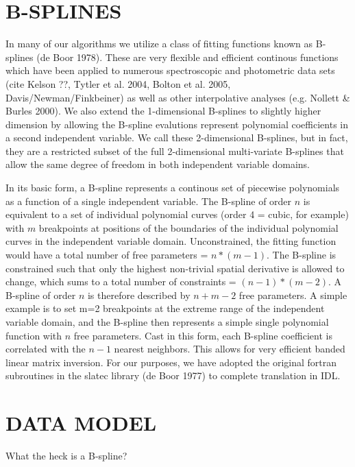 \documentclass[12pt,preprint]{aastex}
\begin{document}
\section{B-SPLINES}
\label{bsplines}

In many of our algorithms we utilize a class of fitting functions known
as B-splines (de Boor 1978).  These are very flexible and efficient 
continous functions which have been applied to numerous spectroscopic
and photometric data sets (cite Kelson ??, Tytler et al. 2004, 
Bolton et al. 2005, Davis/Newman/Finkbeiner) as well as other interpolative
analyses (e.g. Nollett \& Burles 2000).  
We also extend the 1-dimensional
B-splines to slightly higher dimension by allowing the B-spline evalutions
represent polynomial coefficients in a second independent variable.  We 
call these 2-dimensional B-splines, but in fact, 
they are a restricted subset of the full 2-dimensional multi-variate B-splines 
that allow the same degree of freedom in both independent variable domains.

In its basic form, a B-spline represents
a continous set of piecewise polynomials as a function of a single independent
variable.  The B-spline of order $n$ is equivalent to a set 
of individual polynomial curves (order 4 = cubic, for example) with $m$ 
breakpoints at positions of the boundaries of the individual polynomial 
curves in the independent variable domain.  Unconstrained, the fitting function
would have a total number of free parameters = $n * (m-1)$.  The B-spline is
constrained such that only the highest non-trivial spatial derivative is
allowed to change, which sums to a total number of constraints = 
$(n-1) * (m-2)$.  A B-spline of order $n$ is therefore described by 
$n + m - 2$ free parameters.  A simple example is to set m=2 breakpoints at
the extreme range of the independent variable domain, and the B-spline then
represents a simple single polynomial function with $n$ free parameters.
Cast in this form, each B-spline coefficient is correlated with the
$n-1$ nearest neighbors.  This allows for very efficient banded linear matrix
inversion.  For our purposes, we have adopted the original fortran subroutines
in the slatec library (de Boor 1977) to complete translation in IDL.

\appendix
\section{DATA MODEL}
\label{bsplines}

What the heck is a B-spline?

\end{document}
